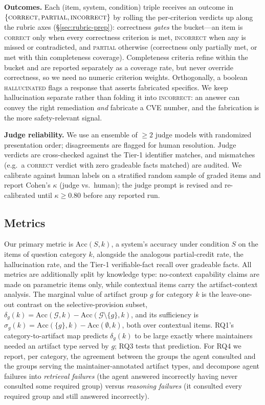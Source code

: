 \textbf{Outcomes.} Each (item, system, condition) triple receives an outcome in
$\{\textsc{correct}, \textsc{partial}, \textsc{incorrect}\}$ by rolling the
per-criterion verdicts up along the rubric axes (\S\ref{sec:rubric-prep}):
correctness \emph{gates} the bucket---an item is \textsc{correct} only when every
correctness criterion is met, \textsc{incorrect} when any is missed or
contradicted, and \textsc{partial} otherwise (correctness only partially met, or
met with thin completeness coverage). Completeness criteria refine within the
bucket and are reported separately as a coverage rate, but never override
correctness, so we need no numeric criterion weights. Orthogonally, a boolean
\textsc{hallucinated} flags a response that asserts fabricated specifics. We keep hallucination separate rather than
folding it into \textsc{incorrect}: an answer can convey the right remediation
\emph{and} fabricate a CVE number, and the fabrication is the more
safety-relevant signal.

\textbf{Judge reliability.} We use an ensemble of $\ge 2$ judge models with
randomized presentation order; disagreements are flagged for human resolution.
Judge verdicts are cross-checked against the Tier-1 identifier matches, and
mismatches (e.g.\ a \textsc{correct} verdict with zero gradeable facts matched)
are audited. We calibrate against human labels on a stratified random sample of
 graded items and report Cohen's $\kappa$ (judge vs.\ human); the
judge prompt is revised and re-calibrated until $\kappa \ge 0.80$ before any
reported run.

\subsection{Metrics}
\label{sec:metrics}

Our primary metric is $\mathrm{Acc}(S, k)$, a system's accuracy under
condition $S$ on the items of question category $k$, alongside the analogous
partial-credit rate, the hallucination rate, and the Tier-1 verifiable-fact recall
over gradeable facts. All metrics are additionally split by knowledge type:
no-context capability claims are made on parametric items only, while contextual
items carry the artifact-context analysis. The marginal value of artifact
group $g$ for category $k$ is the leave-one-out contrast on the
selective-provision subset,
$\delta_g(k) = \mathrm{Acc}(\mathcal{G}, k) -
\mathrm{Acc}(\mathcal{G} \setminus \{g\}, k)$, and its sufficiency is
$\sigma_g(k) = \mathrm{Acc}(\{g\}, k) - \mathrm{Acc}(\emptyset, k)$, both over
contextual items. RQ1's category-to-artifact map predicts $\delta_g(k)$ to be
large exactly where maintainers needed an artifact type served by $g$; RQ3
tests that prediction. For RQ4 we report, per category, the agreement between
the groups the agent consulted and the groups serving the maintainer-annotated
artifact types, and decompose agent failures into \emph{retrieval failures}
(the agent answered incorrectly having never consulted some required group)
versus \emph{reasoning failures} (it consulted every required group and still
answered incorrectly).

